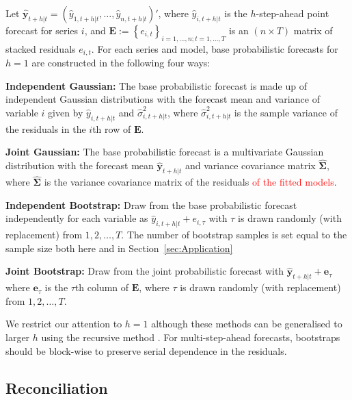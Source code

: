 \documentclass[a4paper,12pt]{article}
\theoremstyle{definition}
\begin{document}
Let $\hat{\bm{y}}_{t+h|t}=\left(\hat{y}_{1,t+h|t},\ldots,\hat{y}_{n,t+h|t}\right)'$, where $\hat{y}_{i,t+h|t}$ is the $h$-step-ahead point forecast for series $i$, and $\bm{E}:=\left\{e_{i,t}\right\}_{i=1,\dots,n;t=1,\dots,T}$ is an $(n \times T)$ matrix of stacked residuals $e_{i,t}$. For each series and model, base probabilistic forecasts for $h=1$ are constructed in the following four ways:
\begin{compactitem}
	\item \textbf{Independent Gaussian:} The base probabilistic forecast is made up of independent Gaussian distributions with the forecast mean and variance of variable $i$ given by $\hat{y}_{i,t+h|t}$ and $\hat{\sigma}^2_{i,t+h|t}$, where $\hat{\sigma}^2_{i,t+h|t}$ is the sample variance of the residuals in the $i$th row of $\bm{E}$.
	\item \textbf{Joint Gaussian:} The base probabilistic forecast is a multivariate Gaussian distribution with the forecast mean $\hat{\bm{y}}_{t+h|t}$ and variance covariance matrix $\hat{\bm\Sigma}$, where $\hat{\bm\Sigma}$ is the variance covariance matrix of the residuals \textcolor{red}{of the fitted models}.
	\item \textbf{Independent Bootstrap:} Draw from the base probabilistic forecast independently for each variable as $\hat{y}_{i,t+h|t}+e_{i,\tau}$ with $\tau$ is drawn randomly (with replacement) from $1,2,\ldots, T$. {\color{red} The number of bootstrap samples is set equal to the sample size both here and in Section~\ref{sec:Application}}
	\item \textbf{Joint Bootstrap:} Draw from the joint probabilistic forecast with $\hat{\bm{y}}_{t+h|t}+\bm{e}_{\tau}$ where $\bm{e}_{\tau}$ is the $\tau$th column of $\bm{E}$, where $\tau$ is drawn randomly (with replacement) from $1,2,\ldots, T$.
\end{compactitem}

We restrict our attention to $h=1$ although these methods can be generalised to larger $h$ using the recursive method \citep{FPP2018}. For multi-step-ahead forecasts, bootstraps should be block-wise to preserve serial dependence in the residuals.

\subsection{Reconciliation}
\end{document}
